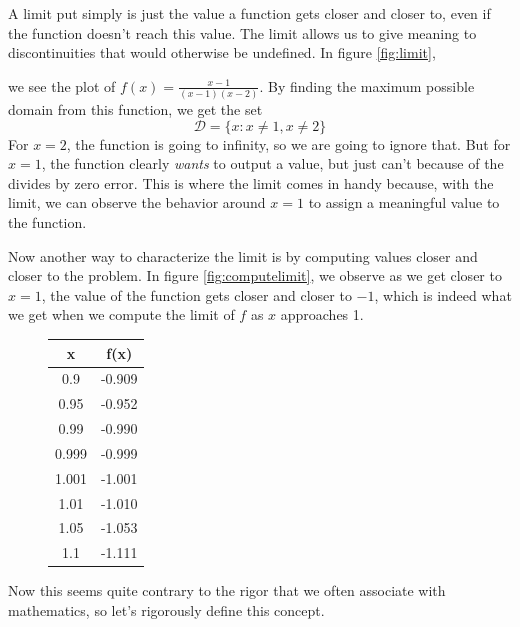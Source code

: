 \documentclass[11pt]{article}
\numberwithin{lemma}{section}
\numberwithin{equation}{section}
\numberwithin{define}{section}
\numberwithin{prop}{section}
\numberwithin{figure}{section}
\numberwithin{theorem}{section}
\numberwithin{cor}{section}
\newcounter{ex}[section]
\numberwithin{ex}{section}
\begin{document}
A limit put simply is just the value a function gets closer and closer to, even if the function doesn't reach this value. The limit allows us to give meaning to discontinuities that would otherwise be undefined. In figure \eqref{fig:limit},
\begin{figure}[h]
	\centering
	\caption{}
	\label{fig:limit}
\end{figure}
we see the plot of $f(x)=\frac{x-1}{(x-1)(x-2)}$. By finding the maximum possible domain from this function, we get the set
$$\mathcal{D}=\{x:x\neq1,x\neq 2\}$$
For $x=2$, the function is going to infinity, so we are going to ignore that. But for $x=1$, the function clearly \textit{wants} to output a value, but just can't because of the divides by zero error.
This is where the limit comes in handy because, with the limit, we can observe the behavior around $x=1$ to assign a meaningful value to the function.

Now another way to characterize the limit is by computing values closer and closer to the problem. 
In figure \eqref{fig:computelimit}, we observe as we get closer to $x=1$, the value of the function gets closer and closer to $-1$, which is indeed what we get when we compute the limit of $f$ as $x$ approaches 1.
\begin{figure}[h]
	\centering
	\begin{tabular}{ |c|c| }
		\hline
		x & f(x) \\
		\hline
		0.9 & -0.909 \\
		0.95 & -0.952\\
		0.99 & -0.990 \\
		0.999 & -0.999 \\
		\hline
		\hline
		1.001 & -1.001 \\
		1.01 & -1.010 \\
		1.05 & -1.053 \\
		1.1 & -1.111 \\
		\hline
	\end{tabular}
	\caption{}
	\label{fig:computelimit}
\end{figure} 
Now this seems quite contrary to the rigor that we often associate with mathematics, so let's rigorously define this concept.
\end{document}
